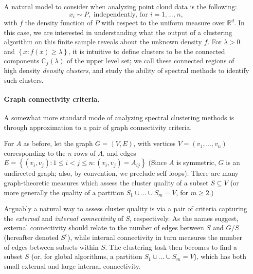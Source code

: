 \documentclass{article}
\newcommand{\set}[1]{\left\{#1\right\}}
\newcommand{\Reals}{\mathbb{R}}
\newcommand{\Rd}{\Reals^d}
\newcommand{\1}{\mathbf{1}}
\theoremstyle{aldenthm}
\theoremstyle{remark}
\begin{document}
A natural model to consider when analyzing point cloud data is the following:
\begin{equation}
x_i \sim P, \text{   independently, for $i = 1,\ldots,n$},
\end{equation} 
with $f$ the density function of $P$ with respect to the uniform measure over $\Rd$. In this case, we are interested in understanding what the output of a clustering algorithm on this finite sample reveals about the unknown density $f$. For $\lambda > 0$ and $\set{x: f(x) \geq \lambda}$, it is intuitive \cite{hartigan1981,chaudhuri2010} to define clusters to be the connected components $\mathbb{C}_f(\lambda)$ of the upper level set; we call these connected regions of high density \textit{density clusters}, and study the ability of spectral methods to identify such clusters. 

\paragraph{Graph connectivity criteria.}

A somewhat more standard mode of analyzing spectral clustering methods is through approximation to a pair of graph connectivity criteria.

For $A$ as before, let the graph $G  = (V,E)$, with vertices $V = (v_1, \ldots, v_n)$ corresponding to the $n$ rows of $A$, and edges $E = \set{(v_i,v_j): 1 \leq i < j \leq n: (v_i,v_j) = A_{ij}}$ (Since $A$ is symmetric, $G$ is an undirected graph; also, by convention, we preclude self-loops). There are many \cite{yang2015,fortunato2010} graph-theoretic measures which assess the cluster quality of a subset $S \subseteq V$ (or more generally the quality of a partition $S_1 \cup \ldots \cup S_m = V$, for $m \geq 2$.)

Arguably a natural way to assess cluster quality is via a pair of criteria capturing the \textit{external} and \textit{internal connectivity} of $S$, respectively.  As the names suggest, external connectivity should relate to the number of edges between $S$ and $G / S$ (hereafter denoted $S^c$), while internal connectivity in turn measures the number of edges between subsets within $S$. The clustering task then becomes to find a subset $S$ (or, for global algorithms, a partition $S_1 \cup \ldots \cup S_m = V$), which has both small external and large internal connectivity. 
\end{document}
